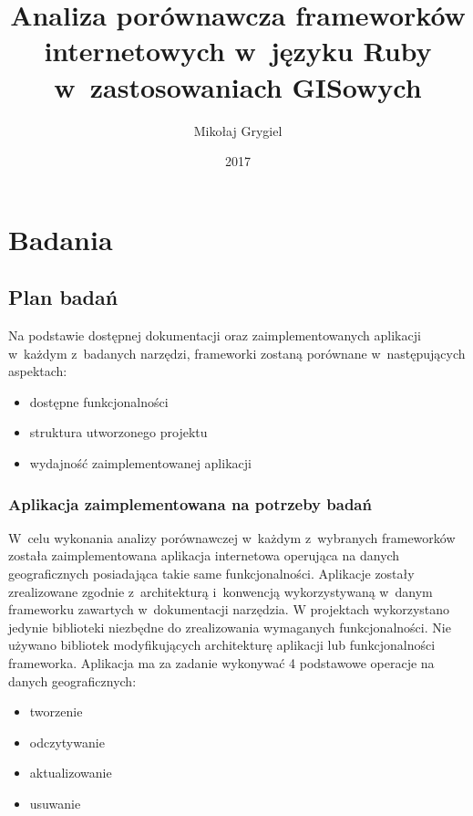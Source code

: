 \documentclass[printmode]{mgr}
\date{2017}
\title{Analiza porównawcza frameworków internetowych w~języku Ruby w~zastosowaniach GISowych}
\author{Mikołaj Grygiel}
\begin{document}


\maketitle

\tableofcontents




\chapter{Badania}

\section{Plan badań}

Na podstawie dostępnej dokumentacji oraz zaimplementowanych aplikacji w~każdym z~badanych narzędzi, frameworki zostaną porównane w~następujących aspektach:
\begin{itemize}
  \item dostępne funkcjonalności
  \item struktura utworzonego projektu
  \item wydajność zaimplementowanej aplikacji
\end{itemize}


\subsection{Aplikacja zaimplementowana na potrzeby badań}

W~celu wykonania analizy porównawczej w~każdym z~wybranych frameworków została zaimplementowana aplikacja internetowa operująca na danych geograficznych posiadająca takie same funkcjonalności. Aplikacje zostały zrealizowane zgodnie z~architekturą i~konwencją wykorzystywaną w~danym frameworku zawartych w~dokumentacji narzędzia. W projektach wykorzystano jedynie biblioteki niezbędne do zrealizowania wymaganych funkcjonalności. Nie używano bibliotek modyfikujących architekturę aplikacji lub funkcjonalności frameworka.
Aplikacja ma za zadanie wykonywać 4 podstawowe operacje na danych geograficznych:
\begin{itemize}
  \item tworzenie
  \item odczytywanie
  \item aktualizowanie
  \item usuwanie
\end{itemize}
\end{document}
